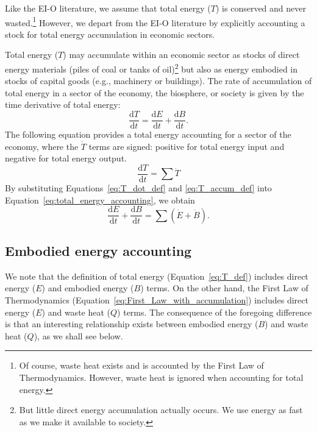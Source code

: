 Like the EI-O literature, we assume that total energy ($T$) is conserved
and never wasted.\footnote{Of course, waste heat exists and is
	accounted by the First Law of Thermodynamics. 
	However, waste heat is ignored when accounting for total energy.}
However, we depart from the EI-O literature by explicitly
accounting a stock 
for total energy accumulation
in economic sectors. 

Total energy ($T$) may accumulate within an economic sector 
as stocks of direct energy materials 
(piles of coal or tanks of oil)\footnote{But little direct
	energy accumulation actually occurs.
	We use energy as fast as we make it available to society.}
but also as energy embodied in stocks of capital goods 
(e.g., machinery or buildings). 
The rate of accumulation of total energy
in a sector of the economy, the biosphere, 
or society is given by the time derivative of total energy:
%
\begin{equation} \label{eq:T_accum_def}
	\frac{\mathrm{d}T}{\mathrm{d}t} 
	= \frac{\mathrm{d}E}{\mathrm{d}t} 
	+ \frac{\mathrm{d}B}{\mathrm{d}t}.
\end{equation}
%
The following equation provides a total energy accounting 
for a sector of the economy, where the $\dot{T}$ terms
are signed: positive for total energy input and negative
for total energy output.
%
\begin{equation} \label{eq:total_energy_accounting}
		\frac{\mathrm{d}T}{\mathrm{d}t}
		= \sum \dot{T}
\end{equation}
%
By substituting Equations~\ref{eq:T_dot_def} and
\ref{eq:T_accum_def} into 
Equation~\ref{eq:total_energy_accounting},
we obtain
%
\begin{equation} \label{eq:total_energy_accounting_details}
	\frac{\mathrm{d}E}{\mathrm{d}t} 
	+ \frac{\mathrm{d}B}{\mathrm{d}t}
	= \sum{\left( \dot{E} 
			+ \dot{B} \right)}.
\end{equation}


\subsection{Embodied energy accounting}

We note that the definition of total energy 
(Equation~\ref{eq:T_def}) includes direct energy ($E$) 
and embodied energy ($B$) terms. 
On the other hand, the First Law of Thermodynamics
(Equation~\ref{eq:First_Law_with_accumulation})
includes direct energy ($E$) and waste heat ($Q$) terms. 
The consequence of the foregoing difference is that 
an interesting relationship exists between embodied energy ($B$) 
and waste heat ($Q$), as we shall see below. 

